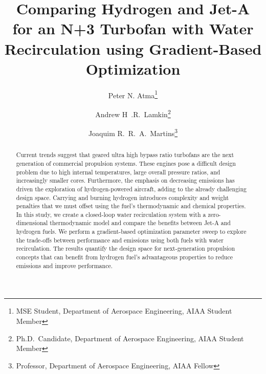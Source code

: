 \documentclass[conf]{new-aiaa}
\title{Comparing Hydrogen and Jet-A for an N+3 Turbofan with Water Recirculation using Gradient-Based Optimization} %
\author{Peter N. Atma\footnote{MSE Student, Department of Aerospace Engineering, AIAA Student Member}}
\author{Andrew H~.R.~Lamkin\footnote{Ph.D.~Candidate, Department of Aerospace Engineering, AIAA Student Member}}
\author{Joaquim R.~R.~A.~Martins\footnote{Professor, Department of Aerospace Engineering, AIAA Fellow}}
\affil{University of Michigan, Ann Arbor, MI, 48109}
\begin{document}
\maketitle

\begin{abstract}
    Current trends suggest that geared ultra high bypass ratio turbofans are the next generation of commercial propulsion systems.
    These engines pose a difficult design problem due to high internal temperatures, large overall pressure ratios, and increasingly smaller cores.
    Furthermore, the emphasis on decreasing emissions has driven the exploration of hydrogen-powered aircraft, adding to the already challenging design space.
    Carrying and burning hydrogen introduces complexity and weight penalties that we must offset using the fuel's thermodynamic and chemical properties.
    In this study, we create a closed-loop water recirculation system with a zero-dimensional thermodynamic model and compare the benefits between Jet-A and hydrogen fuels.
    We perform a gradient-based optimization parameter sweep to explore the trade-offs between performance and emissions using both fuels with water recirculation.
    The results quantify the design space for next-generation propulsion concepts that can benefit from hydrogen fuel's advantageous properties to reduce emissions and improve performance.
\end{abstract}
\end{document}

